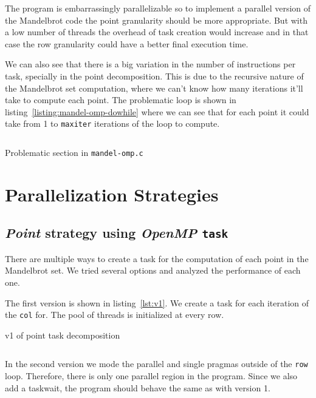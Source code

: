 The program is embarrassingly parallelizable so to implement a parallel version of the Mandelbrot code the point granularity should be more appropriate. But with a low number of threads the overhead of task creation would increase and in that case the row granularity could have a better final execution time.

We can also see that there is a big variation in the number of instructions per task, specially in the point decomposition.
This is due to the recursive nature of the Mandelbrot set computation, where we can't know how many iterations it'll
take to compute each point. The problematic loop is shown in listing~\ref{listing:mandel-omp-dowhile} where we can see
that for each point it could take from 1 to \texttt{maxiter} iterations of the loop to compute.

\begin{listing}[H]
\inputminted[firstline=109,lastline=118]{c}{sources/mandel-omp-v1.c}
\caption{Problematic section in \texttt{mandel-omp.c}}
\label{listing:mandel-omp-dowhile}
\end{listing}

\section{Parallelization Strategies}%
\label{sec:Parallelization Strategies}

\subsection{\emph{Point} strategy using \emph{OpenMP} \texttt{task}}%

There are multiple ways to create a task for the computation of each point in the Mandelbrot set. We tried
several options and analyzed the performance of each one.

The first version is shown in listing~\ref{lst:v1}. We create a task for each iteration of the \texttt{col} for. The
pool of threads is initialized at every row.

\begin{listing}[H]
    \caption{v1 of point task decomposition}
    \inputminted[firstline=91,lastline=98]{c}{sources/mandel-omp-v1.c}
    \label{lst:v1} 
\end{listing}

In the second version we mode the parallel and single pragmas outside of the \texttt{row} loop. Therefore, there
is only one parallel region in the program. Since we also add a taskwait, the program should behave the same as with
version 1. 

